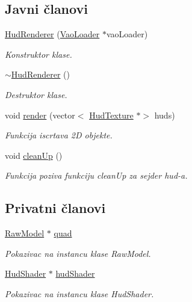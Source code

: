 \subsection*{Javni članovi}
\begin{DoxyCompactItemize}
\item 
\hyperlink{classhud_1_1HudRenderer_ae84f8293c08515d5a7b3e23632b8b6b0}{Hud\+Renderer} (\hyperlink{classcore_1_1VaoLoader}{Vao\+Loader} $\ast$vao\+Loader)
\begin{DoxyCompactList}\small\item\em Konstruktor klase. \end{DoxyCompactList}\item 
\hyperlink{classhud_1_1HudRenderer_abe526b3d520a64670efa3d3aaa986d52}{$\sim$\+Hud\+Renderer} ()
\begin{DoxyCompactList}\small\item\em Destruktor klase. \end{DoxyCompactList}\item 
void \hyperlink{classhud_1_1HudRenderer_a9b64ac407d7e3f8fa9de46ee7f32fd17}{render} (vector$<$ \hyperlink{classhud_1_1HudTexture}{Hud\+Texture} $\ast$$>$ huds)
\begin{DoxyCompactList}\small\item\em Funkcija iscrtava 2D objekte. \end{DoxyCompactList}\item 
void \hyperlink{classhud_1_1HudRenderer_a17ec594190149eee1db61bed6034daae}{clean\+Up} ()
\begin{DoxyCompactList}\small\item\em Funkcija poziva funkciju clean\+Up za sejder hud-\/a. \end{DoxyCompactList}\end{DoxyCompactItemize}
\subsection*{Privatni članovi}
\begin{DoxyCompactItemize}
\item 
\hyperlink{classmodel_1_1RawModel}{Raw\+Model} $\ast$ \hyperlink{classhud_1_1HudRenderer_a322a5afc38f922fbe0f1a6705f8b34ce}{quad}
\begin{DoxyCompactList}\small\item\em Pokazivac na instancu klase Raw\+Model. \end{DoxyCompactList}\item 
\hyperlink{classshader_1_1HudShader}{Hud\+Shader} $\ast$ \hyperlink{classhud_1_1HudRenderer_a6610c7ad17ec6cfdad6c328018030fa2}{hud\+Shader}
\begin{DoxyCompactList}\small\item\em Pokazivac na instancu klase Hud\+Shader. \end{DoxyCompactList}\end{DoxyCompactItemize}


